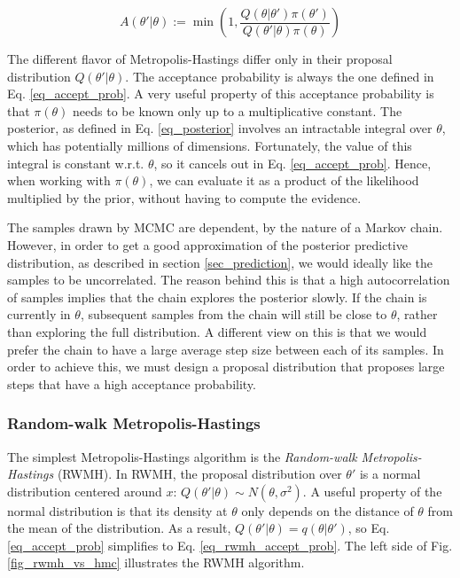 \documentclass[12pt]{article}
\begin{document}
{\begin{equation}
A(\theta'|\theta) := \min \left(1, \frac{Q(\theta|\theta')\pi(\theta')}{Q(\theta'|\theta)\pi(\theta)} \right)
\label{eq_accept_prob}
\end{equation}

The different flavor of Metropolis-Hastings differ only in their proposal distribution $Q(\theta'|\theta)$. The acceptance probability is always the one defined in Eq. \ref{eq_accept_prob}. A very useful property of this acceptance probability is that $\pi(\theta)$ needs to be known only up to a multiplicative constant. The posterior, as defined in Eq. \ref{eq_posterior} involves an intractable integral over $\theta$, which has potentially millions of dimensions. Fortunately, the value of this integral is constant w.r.t. $\theta$, so it cancels out in Eq. \ref{eq_accept_prob}. Hence, when working with $\pi(\theta)$, we can evaluate it as a product of the likelihood multiplied by the prior, without having to compute the evidence.

The samples drawn by MCMC are dependent, by the nature of a Markov chain. However, in order to get a good approximation of the posterior predictive distribution, as described in section \ref{sec_prediction}, we would ideally like the samples to be uncorrelated. The reason behind this is that a high autocorrelation of samples implies that the chain explores the posterior slowly. If the chain is currently in $\theta$, subsequent samples from the chain will still be close to $\theta$, rather than exploring the full distribution. A different view on this is that we would prefer the chain to have a large average step size between each of its samples. In order to achieve this, we must design a proposal distribution that proposes large steps that have a high acceptance probability.

\subsubsection{Random-walk Metropolis-Hastings}

The simplest Metropolis-Hastings algorithm is the \textit{Random-walk Metropolis-Hastings} (RWMH). In RWMH, the proposal distribution over $\theta'$ is a normal distribution centered around $x$: $Q(\theta'|\theta) \sim N(\theta, \sigma^2)$. A useful property of the normal distribution is that its density at $\theta$ only depends on the distance of $\theta$ from the mean of the distribution. As a result, $Q(\theta'|\theta) = q(\theta|\theta')$, so Eq. \ref{eq_accept_prob} simplifies to Eq. \ref{eq_rwmh_accept_prob}. The left side of Fig. \ref{fig_rwmh_vs_hmc} illustrates the RWMH algorithm.

}
\end{document}

